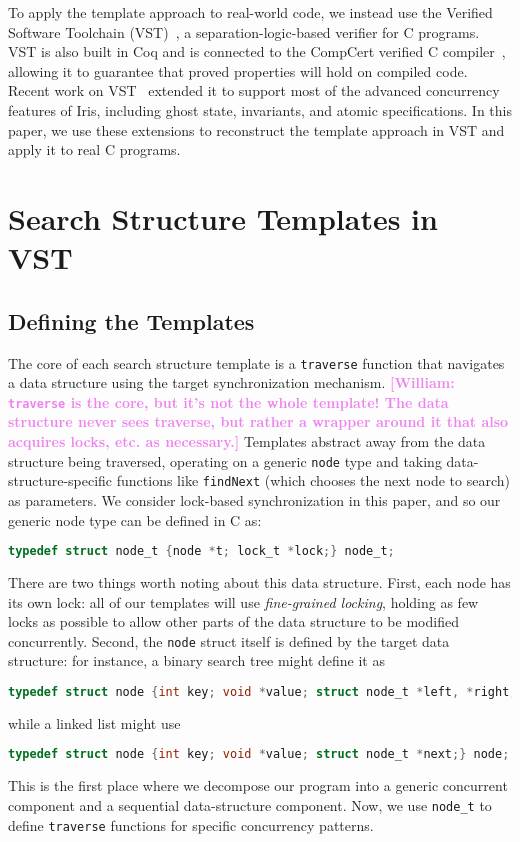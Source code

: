 \documentclass[a4paper,UKenglish,cleveref, autoref, thm-restate]{lipics-v2021}
\newcommand{\wm}[1]{\textbf{\textcolor{violet}{[William: #1]}}}
\begin{document}
To apply the template approach to real-world code, we instead use the Verified Software Toolchain (VST)~\cite{plcc}, a separation-logic-based verifier for C programs. VST is also built in Coq and is connected to the CompCert verified C compiler~\cite{compcert}, allowing it to guarantee that proved properties will hold on compiled code. Recent work on VST~\cite{iris-vst-arxiv} extended it to support most of the advanced concurrency features of Iris, including ghost state, invariants, and atomic specifications. In this paper, we use these extensions to reconstruct the template approach in VST and apply it to real C programs. %

\section{Search Structure Templates in VST}

\subsection{Defining the Templates}
\label{templates}

The core of each search structure template is a \lstinline{traverse} function that navigates a data structure using the target synchronization mechanism. \wm{\lstinline{traverse} is the core, but it's not the whole template! The data structure never sees traverse, but rather a wrapper around it that also acquires locks, etc. as necessary.} Templates abstract away from the data structure being traversed, operating on a generic \lstinline{node} type and taking data-structure-specific functions like \lstinline{findNext} (which chooses the next node to search) as parameters. We consider lock-based synchronization in this paper, and so our generic node type can be defined in C as:
\begin{lstlisting}[language = C, backgroundcolor=\color{white}, basicstyle=\ttfamily\footnotesize]
typedef struct node_t {node *t; lock_t *lock;} node_t;
\end{lstlisting}
There are two things worth noting about this data structure. First, each node has its own lock: all of our templates will use \emph{fine-grained locking}, holding as few locks as possible to allow other parts of the data structure to be modified concurrently. Second, the \lstinline{node} struct itself is defined by the target data structure: for instance, a binary search tree might define it as 
\begin{lstlisting}[language = C, backgroundcolor=\color{white}, basicstyle=\ttfamily\footnotesize]
typedef struct node {int key; void *value; struct node_t *left, *right;} node;
\end{lstlisting}
while a linked list might use
\begin{lstlisting}[language = C, backgroundcolor=\color{white}, basicstyle=\ttfamily\footnotesize]
typedef struct node {int key; void *value; struct node_t *next;} node;
\end{lstlisting}
This is the first place where we decompose our program into a generic concurrent component and a sequential data-structure component. Now, we use \lstinline{node_t} to define \lstinline{traverse} functions for specific concurrency patterns.
\end{document}
